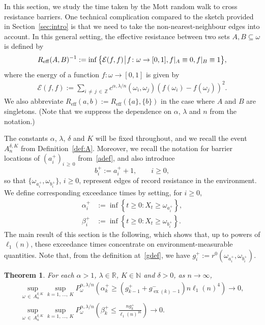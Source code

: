 \documentclass[10pt]{amsart}
\newtheorem{theo}{Theorem}[section]
\theoremstyle{definition}\newtheorem{defi}[theo]{Definition}\newtheorem{rema}[theo]{Remark}\newtheorem{exam}[theo]{Example}\newtheorem{exem}[theo]{Example}\newtheorem{nota}[theo]{Notation}
\newcommand{\N}{\mathbb N}
\newcommand{\Z}{\mathbb Z}
\newcommand{\R}{\mathbb R}
\newcommand{\clE}{\mathcal{E}}
\newcommand{\eff}{\mathrm{eff}}
\newcommand\ex{\operatorname{ex}}
\newcommand{\gtt}[1]{g_{\ex(#1)-1}^-}
\begin{document}
In this section, we study the time taken by the Mott random walk to cross resistance barriers. One technical complication compared to the sketch provided in Section~\ref{sec:intro} is that we need to take the non-nearest-neighbour edges into account. In this general setting, the effective resistance between two sets $A,B\subseteq\omega$ is defined by
\begin{align}\label{eq:def_Reff}
R_\eff(A,B)^{-1}:=\inf\big\{\clE(f,f)\:\vline\:f\colon\omega\to[0,1],f|_A\equiv 0,f|_B\equiv 1 \big\},
\end{align}
where the energy of a function $f\colon\omega\to[0,1]$ is given by
\begin{align}\label{eq:def_E}
\clE(f,f):=\sum_{i\,\neq\,j\,\in\,\Z}c^{\alpha,\lambda/n}(\omega_i,\omega_j)(f(\omega_i)-f(\omega_j))^2.
\end{align}
We also abbreviate $R_\eff(a,b):=R_\eff(\{a\},\{b\})$ in the case where $A$ and $B$ are singletons. (Note that we suppress the dependence on $\alpha$, $\lambda$ and $n$ from the notation.)

The constants $\alpha$, $\lambda$, $\delta$ and $K$ will be fixed throughout, and we recall the event $A_{n}^{\delta,K}$ from Definition~\ref{def:A}. Moreover, we recall the notation for barrier locations of $(a_i^+)_{i\,\geq\,0}$ from~\eqref{adef}, and also introduce
\[
b_i^+:=a_i^++1,\qquad i\geq 0,
\]
so that $\{\omega_{a_i^+},\omega_{b_i^+}\}$, $i\geq0$, represent edges of record resistance in the environment. We define corresponding exceedance times by setting, for $i\geq 0$,
\begin{align}
\alpha_i^+&:=\inf\left\{t\geq 0:X_t\geq \omega_{a_i^+}\right\},\label{eq:alphadef}
\\
\beta_i^+&:=\inf\left\{t\geq 0:X_t\geq \omega_{b_i^+}\right\}.\label{eq:betadef}
\end{align}
The main result of this section is the following, which shows that, up to powers of $\ell_1(n)$, these exceedance times concentrate on environment-measurable quantities. Note that, from the definition at~\eqref{gdef}, we have $g_i^+:=r^0(\omega_{a_i^+},\omega_{b_i^+})$.

\begin{theo}\label{thm:annealed}
For each $\alpha>1$, $\lambda\in\R$, $K\in \N$ and $\delta>0$, as $n\rightarrow\infty$,
\begin{align}
\sup_{\omega\,\in\,A_n^{\delta,K}}\sup_{k=1,\,\dots,\,K} P_\omega^{\alpha,\lambda/n}\left(\alpha_k^+\geq \left(g_{k-1}^++\gtt{k}\right) n\ell_1(n)^4\right)\rightarrow0,\label{eq:not_too_fast}
\\
\sup_{\omega\,\in\,A_n^{\delta,K}}\sup_{k=1,\,\dots,\,K} P_\omega^{\alpha,\lambda/n}\left(\beta_k^+\leq \frac{ng_k^+}{\ell_1(n)^{16}}\right)\rightarrow0.\label{eq:not_too_slow}
\end{align}
\end{theo}
\end{document}
